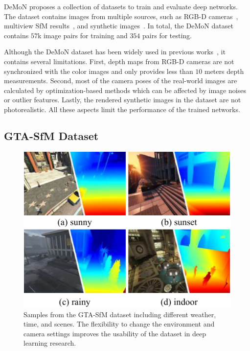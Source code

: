 \documentclass[letterpaper, 10 pt, conference]{ieeeconf}  %
\begin{document}
DeMoN proposes a collection of datasets to train and evaluate deep networks. The dataset contains images from multiple sources, such as RGB-D cameras~\cite{sun3d,sturm12iros}, multiview SfM results~\cite{sfm_revist,schonberger_2016, mve_2014,ummenhofer_2015}, and synthetic images~\cite{demon}. In total, the DeMoN dataset contains $57$k image pairs for training and $354$ pairs for testing.
 
Although the DeMoN dataset has been widely used in previous works~\cite{demon, ls_net, BA-Net}, it contains several limitations. First, depth maps from RGB-D cameras are not synchronized with the color images and only provides less than $10$ meters depth measurements. Second, most of the camera poses of the real-world images are calculated by optimization-based methods which can be affected by image noises or outlier features. Lastly, the rendered synthetic images in the dataset are not photorealistic. All these aspects limit the performance of the trained networks.
 
\subsection{GTA-SfM Dataset}
 
\begin{figure}[t]
\begin{center}
\vspace{0.3cm}
\includegraphics[width=0.85\linewidth]{figs/extracted.pdf}
\end{center}
\vspace{-0.3cm}
\caption{Samples from the GTA-SfM dataset including different weather, time, and scenes. The flexibility to change the environment and camera settings improves the usability of the dataset in deep learning research.}
\label{fig:extracted}
\vspace{-0.5cm}
\end{figure}
 
\end{document}
